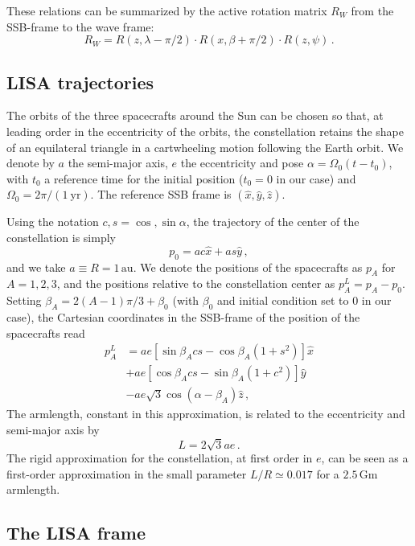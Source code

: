 \documentclass[aps,showpacs,twocolumn,prd,superscriptaddress,nofootinbib]{revtex4-1}
\newcommand{\be}{\begin{equation}}
\newcommand{\ee}{\end{equation}}
\newcommand{\bsub}{\begin{subequations}}
\newcommand{\esub}{\end{subequations}}
\newcommand{\nn}{\nonumber}
\begin{document}
These relations can be summarized by the active rotation matrix $R_{W}$ from the SSB-frame to the wave frame:
\be\label{eq:RW}
	R_{W} = R(z, \lambda - \pi/2) \cdot R(x, \beta + \pi/2 ) \cdot R(z, \psi)\,.
\ee


\subsection{LISA trajectories}
\label{app:lisatraj}

The orbits of the three spacecrafts around the Sun can be chosen so that, at leading order in the eccentricity of the orbits, the constellation retains the shape of an equilateral triangle in a cartwheeling motion following the Earth orbit. We denote by $a$ the semi-major axis, $e$ the eccentricity and pose $\alpha = \Omega_{0} (t-t_{0})$, with $t_{0}$ a reference time for the initial position ($t_{0} = 0$ in our case) and $\Omega_{0} = 2\pi / (1\ \mathrm{yr})$. The reference SSB frame is $(\hat{x}, \hat{y}, \hat{z})$.

Using the notation $c,s = \cos, \sin \alpha$, the trajectory of the center of the constellation is simply
\be
	p_{0} = ac \hat{x} + as \hat{y} \,,
\ee
and we take $a\equiv R = 1 \, \mathrm{au}$. We denote the positions of the spacecrafts as $p_{A}$ for $A=1,2,3$, and the positions relative to the constellation center as $p_{A}^{L} = p_{A} - p_{0}$. Setting $\beta_{A} = 2(A-1)\pi/3 + \beta_{0}$ (with $\beta_{0}$ and initial condition set to 0 in our case), the Cartesian coordinates in the SSB-frame of the position of the spacecrafts read
\bsub
\begin{align}
	p_{A}^{L} &= a e \left[ \sin \beta_{A} c s - \cos\beta_{A} \left( 1 + s^{2} \right) \right] \hat{x} \nn\\
	& + a e \left[ \cos \beta_{A} c s - \sin\beta_{A} \left( 1 + c^{2} \right) \right] \hat{y} \nn\\
	& - a e \sqrt{3} \cos(\alpha - \beta_{A}) \hat{z} \,,
\end{align}
\esub
The armlength, constant in this approximation, is related to the eccentricity and semi-major axis by
\be
	L = 2\sqrt{3} a e \,.
\ee
The rigid approximation for the constellation, at first order in $e$, can be seen as a first-order approximation in the small parameter $L/R \simeq 0.017$ for a $2.5 \, \mathrm{Gm}$ armlength.


\subsection{The LISA frame}
\label{app:LISAframe}
\end{document}
